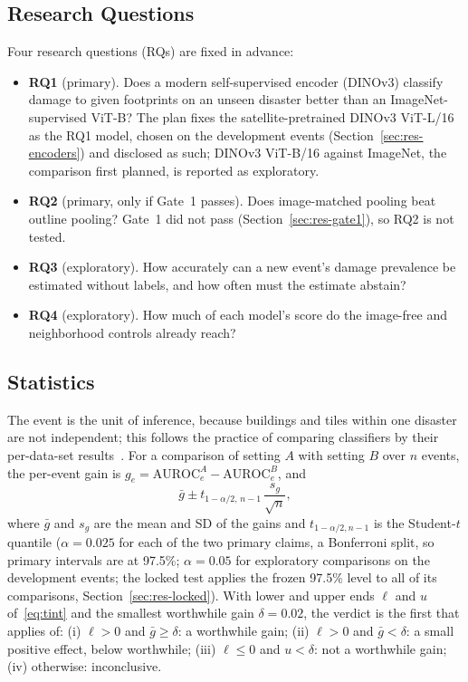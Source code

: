 \documentclass[journal]{IEEEtran}
\begin{document}
\subsection{Research Questions}
Four research questions (RQs) are fixed in advance:
\begin{itemize}
\item \textbf{RQ1} (primary). Does a modern self-supervised encoder (DINOv3) classify damage to given footprints on an unseen disaster better than an ImageNet-supervised ViT-B? The plan fixes the satellite-pretrained DINOv3 ViT-L/16 as the RQ1 model, chosen on the development events (Section~\ref{sec:res-encoders}) and disclosed as such; DINOv3 ViT-B/16 against ImageNet, the comparison first planned, is reported as exploratory.
\item \textbf{RQ2} (primary, only if Gate~1 passes). Does image-matched pooling beat outline pooling? Gate~1 did not pass (Section~\ref{sec:res-gate1}), so RQ2 is not tested.
\item \textbf{RQ3} (exploratory). How accurately can a new event's damage prevalence be estimated without labels, and how often must the estimate abstain?
\item \textbf{RQ4} (exploratory). How much of each model's score do the image-free and neighborhood controls already reach?
\end{itemize}

\subsection{Statistics}
\label{sec:stats}
The event is the unit of inference, because buildings and tiles within one disaster are not independent; this follows the practice of comparing classifiers by their per-data-set results~\cite{demsar2006comparisons}. For a comparison of setting $A$ with setting $B$ over $n$ events, the per-event gain is $g_e=\mathrm{AUROC}_e^{A}-\mathrm{AUROC}_e^{B}$, and
\begin{equation}
\bar g\pm t_{1-\alpha/2,\,n-1}\,\frac{s_g}{\sqrt{n}},
\label{eq:tint}
\end{equation}
where $\bar g$ and $s_g$ are the mean and SD of the gains and $t_{1-\alpha/2,n-1}$ is the Student-$t$ quantile ($\alpha=0.025$ for each of the two primary claims, a Bonferroni split, so primary intervals are at 97.5\%; $\alpha=0.05$ for exploratory comparisons on the development events; the locked test applies the frozen 97.5\% level to all of its comparisons, Section~\ref{sec:res-locked}). With lower and upper ends $\ell$ and $u$ of~\eqref{eq:tint} and the smallest worthwhile gain $\delta=0.02$, the verdict is the first that applies of: (i) $\ell>0$ and $\bar g\ge\delta$: a worthwhile gain; (ii) $\ell>0$ and $\bar g<\delta$: a small positive effect, below worthwhile; (iii) $\ell\le0$ and $u<\delta$: not a worthwhile gain; (iv) otherwise: inconclusive.
\end{document}
